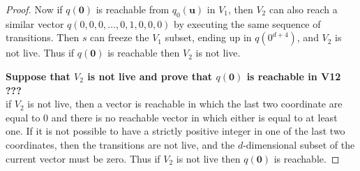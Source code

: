 \begin{proof}
Now if $q(\textbf{0})$ is reachable from $q_0(\textbf{u})$ in $V_1$, then $V_2$ can also reach a similar
vector $q(0,0,0,\ldots, 0, 1,0,0,0)$ by executing the same sequence of transitions.
Then $s$ can freeze the $V_1$ subset,
ending up in $q(0^{d+4})$, and $V_2$ is not live.
Thus if $q(\textbf{0})$ is reachable then $V_2$ is not live.


{\bf Suppose that $V_2$ is not live and prove that 
$q(\textbf{0})$ is reachable in V12 ???}\\

if $V_2$ is not live, then a vector  is reachable in which the last two coordinate are equal to $0$ and there is no reachable vector in which either is equal to at least one.
If it is not possible to have a strictly positive integer in one of the last two coordinates, then the transitions  are not live, and the
$d$-dimensional subset of the current vector must be zero.
Thus if $V_2$ is not live then 
$q(\textbf{0})$ is reachable.
\end{proof}








